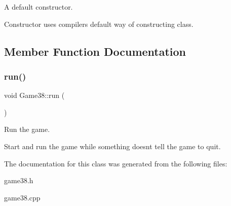 A default constructor. 

Constructor uses compiler\textquotesingle{}s default way of constructing class. 

\subsection{Member Function Documentation}
\mbox{\label{classGame38_ab9e0b292923fbef270ab0cea6c59cf23}} 
\subsubsection{\texorpdfstring{run()}{run()}}
{\footnotesize\ttfamily void Game38\+::run (\begin{DoxyParamCaption}{ }\end{DoxyParamCaption})}



Run the game. 

Start and run the game while something doesn\textquotesingle{}t tell the game to quit. 

The documentation for this class was generated from the following files\+:\begin{DoxyCompactItemize}
\item 
game38.\+h\item 
game38.\+cpp\end{DoxyCompactItemize}
